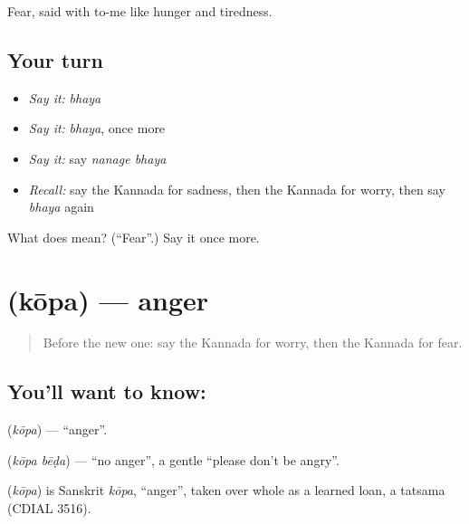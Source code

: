 \begin{grammarlens}[title={What you've built}]
Fear, said with to-me like hunger and tiredness.
\end{grammarlens}

\subsection*{Your turn}
\begin{itemize}
\raggedright
  \item \emph{Say it:} \emph{bhaya}
  \item \emph{Say it:} \emph{bhaya}, once more
  \item \emph{Say it:} say \emph{nanage bhaya}
  \item \emph{Recall:} say the Kannada for sadness, then the Kannada for worry, then say \emph{bhaya} again
\end{itemize}

\begin{tcolorbox}[breakable,colback=teal!4,colframe=teal!35!black,title={Before you move on}]
What does  mean? (\textquotedblleft{}Fear\textquotedblright{}.) Say it once more.
\end{tcolorbox}
\section[\texorpdfstring{\kn{ಕೋಪ} (kōpa)}{ಕೋಪ (kōpa)}]{ (kōpa) — anger}

\label{lesson:KA-C83-anger}



\begin{quote}
Before the new one: say the Kannada for worry, then the Kannada for fear.
\end{quote}

\subsection*{You'll want to know: }
\textbf{} (\emph{kōpa}) — \textquotedblleft{}anger\textquotedblright{}.

\textbf{ } (\emph{kōpa bēḍa}) — \textquotedblleft{}no anger\textquotedblright{}, a gentle \textquotedblleft{}please don't be angry\textquotedblright{}.

\begin{cousinweb}
\textbf{} (\emph{kōpa}) is Sanskrit \emph{kōpa}, \textquotedblleft{}anger\textquotedblright{}, taken over whole as a learned loan, a tatsama (CDIAL 3516).
\end{cousinweb}

